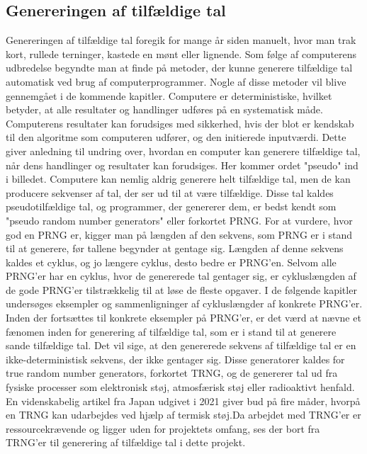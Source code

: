 \subsection{Genereringen af tilfældige tal}
Genereringen af tilfældige tal foregik for mange år siden manuelt, hvor man trak kort, rullede terninger, kastede en mønt eller lignende. Som følge af computerens udbredelse begyndte man at finde på metoder, der kunne generere tilfældige tal automatisk ved brug af computerprogrammer. Nogle af disse metoder vil blive gennemgået i de kommende kapitler.
Computere er deterministiske, hvilket betyder, at alle resultater og handlinger udføres på en systematisk måde. Computerens resultater kan forudsiges med sikkerhed, hvis der blot er kendskab til den algoritme som computeren udfører, og den initierede inputværdi. Dette giver anledning til undring over, hvordan en computer kan generere tilfældige tal, når dens handlinger og resultater kan forudsiges. Her kommer ordet "pseudo" ind i billedet. Computere kan nemlig aldrig generere helt tilfældige tal, men de kan producere sekvenser af tal, der ser ud til at være tilfældige. Disse tal kaldes pseudotilfældige tal, og programmer, der genererer dem, er bedst kendt som "pseudo random number generators" eller forkortet PRNG. For at vurdere, hvor god en PRNG er, kigger man på længden af den sekvens, som PRNG er i stand til at generere, før tallene begynder at gentage sig. Længden af denne sekvens kaldes et cyklus, og jo længere cyklus, desto bedre er PRNG'en. Selvom alle PRNG'er har en cyklus, hvor de genererede tal gentager sig, er cykluslængden af de gode PRNG'er tilstrækkelig til at løse de fleste opgaver. I de følgende kapitler undersøges eksempler og sammenligninger af cykluslængder af konkrete PRNG'er. Inden der fortsættes til konkrete eksempler på PRNG'er, er det værd at nævne et fænomen inden for generering af tilfældige tal, som er i stand til at generere sande tilfældige tal. Det vil sige, at den genererede sekvens af tilfældige tal er en ikke-deterministisk sekvens, der ikke gentager sig. Disse generatorer kaldes for true random number generators, forkortet TRNG, og de genererer tal ud fra fysiske processer som elektronisk støj, atmosfærisk støj eller radioaktivt henfald. En videnskabelig artikel fra Japan udgivet i 2021
\cite{Matsuoka2021} 
giver bud på fire måder, hvorpå en TRNG kan udarbejdes ved hjælp af termisk støj.Da arbejdet med TRNG'er er ressourcekrævende og ligger uden for projektets omfang, ses der bort fra TRNG'er til generering af tilfældige tal i dette projekt.
